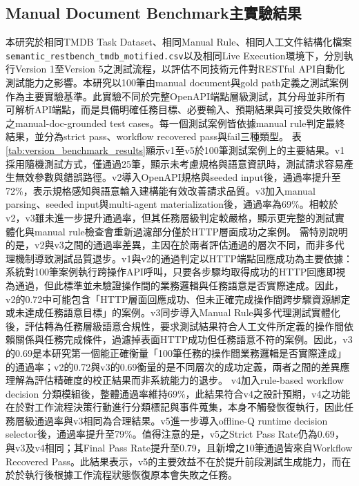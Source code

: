\begin{ZhChapter}
\section{Manual Document Benchmark主實驗結果}
\text 本研究於相同TMDB Task Dataset、相同Manual Rule、相同人工文件結構化檔案\texttt{semantic\_restbench\_tmdb\_motified.csv}以及相同Live Execution環境下，分別執行Version 1至Version 5之測試流程，以評估不同技術元件對RESTful API自動化測試能力之影響。本研究以100筆由manual document與gold path定義之測試案例作為主要實驗基準。此實驗不同於完整OpenAPI端點層級測試，其分母並非所有可解析API端點，而是具備明確任務目標、必要輸入、預期結果與可接受失敗條件之manual-doc-grounded test cases。每一個測試案例皆依據manual rule判定最終結果，並分為strict pass、workflow recovered pass與fail三種類型。
\text 表\ref{tab:version_benchmark_results}顯示v1至v5於100筆測試案例上的主要結果。v1採用隨機測試方式，僅通過25筆，顯示未考慮規格與語意資訊時，測試請求容易產生無效參數與錯誤路徑。v2導入OpenAPI規格與seeded input後，通過率提升至72\%，表示規格感知與語意輸入建構能有效改善請求品質。v3加入manual parsing、seeded input與multi-agent materialization後，通過率為69\%。相較於v2，v3雖未進一步提升通過率，但其任務層級判定較嚴格，顯示更完整的測試實體化與manual rule檢查會重新過濾部分僅於HTTP層面成功之案例。
\text 需特別說明的是，v2與v3之間的通過率差異，主因在於兩者評估通過的層次不同，而非多代理機制導致測試品質退步。v1與v2的通過判定以HTTP端點回應成功為主要依據：系統對100筆案例執行跨操作API呼叫，只要各步驟均取得成功的HTTP回應即視為通過，但此標準並未驗證操作間的業務邏輯與任務語意是否實際達成。因此，v2的0.72中可能包含「HTTP層面回應成功、但未正確完成操作間跨步驟資源綁定或未達成任務語意目標」的案例。v3同步導入Manual Rule與多代理測試實體化後，評估轉為任務層級語意合規性，要求測試結果符合人工文件所定義的操作間依賴關係與任務完成條件，過濾掉表面HTTP成功但任務語意不符的案例。因此，v3的0.69是本研究第一個能正確衡量「100筆任務的操作間業務邏輯是否實際達成」的通過率；v2的0.72與v3的0.69衡量的是不同層次的成功定義，兩者之間的差異應理解為評估精確度的校正結果而非系統能力的退步。
\text v4加入rule-based workflow decision 分類模組後，整體通過率維持69\%，此結果符合v4之設計預期，v4之功能在於對工作流程決策行動進行分類標記與事件蒐集，本身不觸發恢復執行，因此任務層級通過率與v3相同為合理結果。v5進一步導入offline-Q runtime decision selector後，通過率提升至79\%。值得注意的是，v5之Strict Pass Rate仍為0.69，與v3及v4相同；其Final Pass Rate提升至0.79，且新增之10筆通過皆來自Workflow Recovered Pass。此結果表示，v5的主要效益不在於提升前段測試生成能力，而在於於執行後根據工作流程狀態恢復原本會失敗之任務。


\end{ZhChapter}
